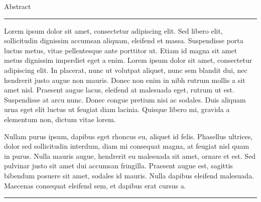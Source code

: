 \begin{vcenterpage}
{\LARGE{\sc Abstract}}

\noindent\rule[2pt]{\textwidth}{0.5pt}
Lorem ipsum dolor sit amet, consectetur adipiscing elit. Sed libero elit, sollicitudin dignissim accumsan aliquam, eleifend et massa. Suspendisse porta luctus metus, vitae pellentesque ante porttitor ut. Etiam id magna sit amet metus dignissim imperdiet eget a enim. Lorem ipsum dolor sit amet, consectetur adipiscing elit. In placerat, nunc ut volutpat aliquet, nunc sem blandit dui, nec hendrerit justo augue non mauris. Donec non enim in nibh rutrum mollis a sit amet nisl. Praesent augue lacus, eleifend at malesuada eget, rutrum ut est. Suspendisse at arcu nunc. Donec congue pretium nisi ac sodales. Duis aliquam urna eget elit luctus ut feugiat diam lacinia. Quisque libero mi, gravida a elementum non, dictum vitae lorem.

Nullam purus ipsum, dapibus eget rhoncus eu, aliquet id felis. Phasellus ultrices, dolor sed sollicitudin interdum, diam mi consequat magna, at feugiat nisl quam in purus. Nulla mauris augue, hendrerit eu malesuada sit amet, ornare et est. Sed pulvinar justo sit amet dui accumsan fringilla. Praesent augue est, sagittis bibendum posuere sit amet, sodales id mauris. Nulla dapibus eleifend malesuada. Maecenas consequat eleifend sem, et dapibus erat cursus a.

\noindent\rule[2pt]{\textwidth}{0.5pt}
\end{vcenterpage}
